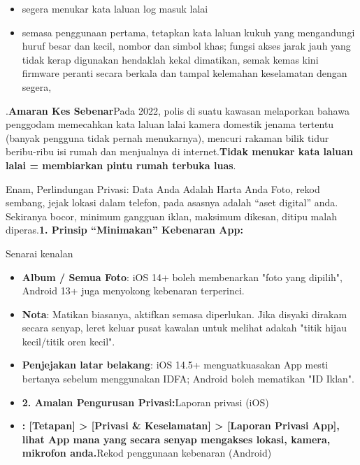 \begin{itemize}
  \item segera menukar kata laluan log masuk lalai
  \item semasa penggunaan pertama, tetapkan kata laluan kukuh yang mengandungi huruf besar dan kecil, nombor dan simbol khas; fungsi akses jarak jauh yang tidak kerap digunakan hendaklah kekal dimatikan, semak kemas kini firmware peranti secara berkala dan tampal kelemahan keselamatan dengan segera,
\end{itemize}


.\textbf{Amaran Kes Sebenar}Pada 2022, polis di suatu kawasan melaporkan bahawa penggodam memecahkan kata laluan lalai kamera domestik jenama tertentu (banyak pengguna tidak pernah menukarnya), mencuri rakaman bilik tidur beribu-ribu isi rumah dan menjualnya di internet.\textbf{Tidak menukar kata laluan lalai = membiarkan pintu rumah terbuka luas}.

\begin{tcbwarn}{Enam, Perlindungan Privasi: Data Anda Adalah Harta Anda}
Foto, rekod sembang, jejak lokasi dalam telefon, pada asasnya adalah “aset digital” anda. Sekiranya bocor, minimum gangguan iklan, maksimum dikesan, ditipu malah diperas.\textbf{1. Prinsip “Minimakan” Kebenaran App:}

\end{tcbwarn}


Senarai kenalan


\begin{itemize}
  \item \textbf{Album / Semua Foto}: iOS 14+ boleh membenarkan "foto yang dipilih", Android 13+ juga menyokong kebenaran terperinci.
  \item \textbf{Nota}: Matikan biasanya, aktifkan semasa diperlukan. Jika disyaki dirakam secara senyap, leret keluar pusat kawalan untuk melihat adakah "titik hijau kecil/titik oren kecil".
  \item \textbf{Penjejakan latar belakang}: iOS 14.5+ menguatkuasakan App mesti bertanya sebelum menggunakan IDFA; Android boleh mematikan "ID Iklan".
  \item \textbf{2. Amalan Pengurusan Privasi:}Laporan privasi (iOS)
  \item \textbf{: [Tetapan] > [Privasi \& Keselamatan] > [Laporan Privasi App], lihat App mana yang secara senyap mengakses lokasi, kamera, mikrofon anda.}Rekod penggunaan kebenaran (Android)
\end{itemize}

